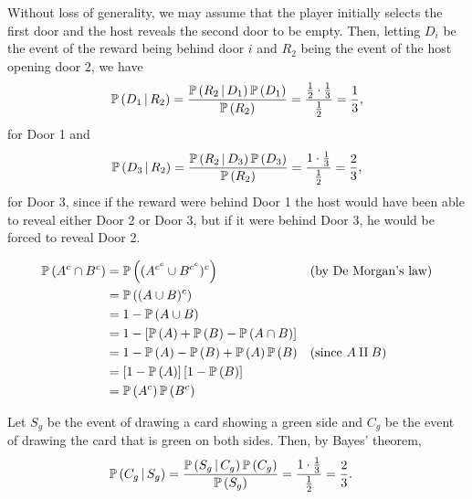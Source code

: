 \begin{ex}
  Without loss of generality, we may assume that the player initially selects
  the first door and the host reveals the second door to be empty. Then, letting
  $D_i$ be the event of the reward being behind door $i$ and $R_2$ being the
  event of the host opening door $2$, we have
  \begin{align*}
    \cP{D_1}{R_2}
    =\frac{\cP{R_2}{D_1}\P{D_1}}{\P{R_2}}
    =\frac{\frac{1}{2}\cdot\frac{1}{3}}{\frac{1}{2}}=\frac{1}{3},
  \end{align*}
  for Door 1 and
  \begin{align*}
    \cP{D_3}{R_2}
    =\frac{\cP{R_2}{D_3}\P{D_3}}{\P{R_2}}
    =\frac{1\cdot\frac{1}{3}}{\frac{1}{2}}=\frac{2}{3},
  \end{align*}
  for Door 3, since if the reward were behind Door 1 the host would have been
  able to reveal either Door 2 or Door 3, but if it were behind Door 3, he
  would be forced to reveal Door 2.
\end{ex}

\begin{ex}
  \begin{align*}
    \P{A^c\cap B^c}
     & =\P{(A^{c^c}\cup B^{c^c})^c}                  &  & \text{(by De Morgan's law)} \\
     & =\P{(A \cup B)^c}                                                              \\
     & =1 - \P{A\cup B}                                                               \\
     & =1 - \left[\P{A} + \P{B} - \P{A\cap B}\right]                                  \\
     & =1-\P{A}-\P{B}+\P{A}\P{B}                     &  & \text{(since $A\amalg B$)}  \\
     & =\left[1-\P{A}\right]\left[1-\P{B}\right]                                      \\
     & =\P{A^c}\P{B^c}
  \end{align*}
\end{ex}

\begin{ex}
  Let $S_g$ be the event of drawing a card showing a green side and $C_g$ be the
  event of drawing the card that is green on both sides. Then, by Bayes'
  theorem,
  \begin{align*}
    \cP{C_g}{S_g}
     & =\frac{\cP{S_g}{C_g}\P{C_g}}{\P{S_g}}
    =\frac{1\cdot \frac{1}{3}}{\frac{1}{2}}
    =\frac{2}{3}.
  \end{align*}
\end{ex}

